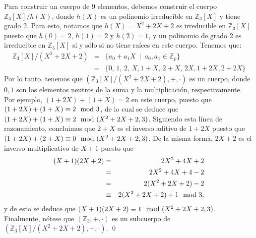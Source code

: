 \begin{example}
Para construir un cuerpo de 9 elementos, debemos construir el cuerpo
$\mathbb{Z}_3[X]/h(X)$, donde $h(X)$ es un polinomio irreducible en
$\mathbb{Z}_3[X]$ y tiene grado 2. Para esto, notamos que $h(X) =
X^2+2X+2$ es irreducible en $\mathbb{Z}_3[X]$ puesto que $h(0) = 2$,
$h(1) = 2$ y $h(2) = 1$, y un polinomio de grado 2 es irreducible en
$\mathbb{Z}_3[X]$ si y sólo si no tiene raíces en este cuerpo. Tenemos
que:
\begin{eqnarray*}
	\mathbb{Z}_3[X]/(X^2+2X+2) &=& \{a_0 +a_1X \ \mid \
	a_0,a_1 \in \mathbb{Z}_p \}\\
	&=& \{0,\,1,\,2,\,X,1+X,\,2+X,\,2X,1+2X,2+2X\}
\end{eqnarray*}
Por lo tanto, tenemos que $(\mathbb{Z}_3[X]/(X^2+2X+2), +, \cdot)$ es
un cuerpo, donde $0, 1$ son los elementos neutros de la suma y la
multiplicación, respectivamente. Por ejemplo, $(1+2X) + (1+X) = 2$ en
este cuerpo, puesto que $(1+2X) + (1+X) \equiv 2 \mod 3$, de lo cual
se deduce que $(1+2X) + (1+X) \equiv 2 \mod (X^2+2X+2, 3)$. Siguiendo
esta línea de razonamiento, concluimos que $2+X$ es el inverso aditivo
de $1+2X$ puesto que $(1+2X) + (2+X) \equiv 0 \mod (X^2+2X+2, 3)$. De
la misma forma, $2X+2$ es el inverso multiplicativo de $X+1$ puesto
que
\begin{eqnarray*}
(X+1)(2X+2) & = & 2X^2 + 4X + 2\\
& = & 2X^2 + 4X + 4 - 2\\
& = & 2(X^2 + 2X + 2) - 2\\
& \equiv & 2(X^2 + 2X + 2) + 1 \mod 3,
\end{eqnarray*}
y de esto se deduce que $(X+1)(2X+2) \equiv 1 \mod (X^2+2X+2,
3)$. Finalmente, nótese que $(\mathbb{Z}_3, +, \cdot)$
es un subcuerpo de $(\mathbb{Z}_3[X]/(X^2+2X+2), +, \cdot)$. \qed
\end{example}

